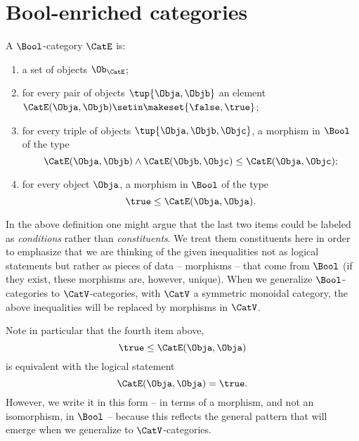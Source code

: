 
\section{Bool-enriched categories}
\label{sec:bool-enrichment}

\begin{ctdefinition}
    \label{def:bool-category}
    A $\Bool$-category $\CatE$ is:

    \constit
    \begin{enumerate}
        \item a set of objects $\Ob_\CatE$;
        \item for every pair of objects $\tup{\Obja, \Objb}$ an element $\CatE(\Obja, \Objb) \setin\makeset{\false, \true}$;
        \item for every triple of objects $\tup{\Obja, \Objb, \Objc}$, a morphism in $\Bool$ of the type
              \begin{equation}
                  \CatE(\Obja, \Objb) \wedge \CatE(\Objb, \Objc) \leq \CatE(\Obja, \Objc);
              \end{equation}
        \item for every object $\Obja$, a morphism in $\Bool$ of the type
              \begin{equation}
                  \true \leq \CatE(\Obja, \Obja).
              \end{equation}
    \end{enumerate}
\end{ctdefinition}

In the above definition one might argue that the last two items could be labeled as \emph{conditions} rather than \emph{constituents}.
We treat them constituents here in order to emphasize that we are thinking of the given inequalities not as logical statements but rather as pieces of data -- morphisms -- that come from $\Bool$ (if they exist, these morphisms are, however, unique).
When we generalize $\Bool$-categories to $\CatV$-categories, with $\CatV$ a symmetric monoidal category, the above inequalities will be replaced by morphisms in $\CatV$.

Note in particular that the fourth item above,
\begin{equation}
    \true \leq \CatE(\Obja, \Obja)
\end{equation}
is equivalent with the logical statement
\begin{equation}
    \CatE(\Obja, \Obja) = \true.
\end{equation}
However, we write it in this form -- in terms of a morphism, and not an isomorphism, in $\Bool$ -- because this reflects the general pattern that will emerge when we generalize to $\CatV$-categories.

